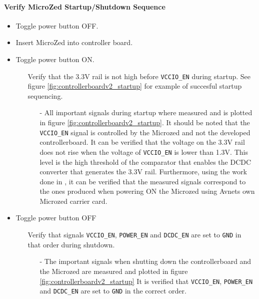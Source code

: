 \paragraph{Verify MicroZed Startup/Shutdown Sequence} %
\label{par:verify_microzed_startup_shutdown_sequence}
\begin{itemize}
	\item Toggle power button OFF.
	\item Insert MicroZed into controller board.
	\item Toggle power button ON.
	\begin{itemize}
		\item[\cmark] Verify that the 3.3V rail is not high before \texttt{VCCIO\_EN} during startup. See figure \ref{fig:controllerboardv2_startup} for example of succesful startup sequencing.
		\begin{itemize}
			\item[-]
			All important signals during startup where measured and is plotted in figure \ref{fig:controllerboardv2_startup}.
			It should be noted that the \texttt{VCCIO\_EN} signal is controlled by the Microzed and not the developed controllerboard. 
			It can be verified that the voltage on the 3.3V rail does not rise when the voltage of \texttt{VCCIO\_EN} is lower than 1.3V.
			This level is the high threshold of the comparator that enables the DCDC converter that generates the 3.3V rail.
			Furthermore, using the work done in \cite{isaswarm}, it can be verified that the measured signals correspond to the ones produced when powering ON the Microzed using Avnets own Microzed carrier card.
		\end{itemize}
	\end{itemize}
	\item Toggle power button OFF
	\begin{itemize}
		\item[\cmark] Verify that signals \texttt{VCCIO\_EN}, \texttt{POWER\_EN} and \texttt{DCDC\_EN} are set to \texttt{GND} in that order during shutdown. 
		\begin{itemize}
			\item[-] The important signals when shutting down the controllerboard and the Microzed are measured and plotted in figure \ref{fig:controllerboardv2_startup}
			It is verified that \texttt{VCCIO\_EN}, \texttt{POWER\_EN} and \texttt{DCDC\_EN} are set to \texttt{GND} in the correct order. 
		\end{itemize}
	\end{itemize}
\end{itemize}

